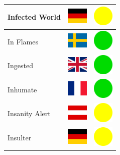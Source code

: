 \documentclass[12pt, a4paper, twoside]{report}
\begin{document}
\begin{center}
\begin{longtable}{|p{5cm}|p{2cm}|p{2cm}|}
Infected World & \includegraphics[width=1cm]{4x3/de} & \includegraphics[width=1cm]{likes/m} \\ \hline
In Flames & \includegraphics[width=1cm]{4x3/se} & \includegraphics[width=1cm]{likes/y} \\ \hline
Ingested & \includegraphics[width=1cm]{4x3/gb} & \includegraphics[width=1cm]{likes/y} \\ \hline
Inhumate & \includegraphics[width=1cm]{4x3/fr} & \includegraphics[width=1cm]{likes/y} \\ \hline
Insanity Alert & \includegraphics[width=1cm]{4x3/at} & \includegraphics[width=1cm]{likes/m} \\ \hline
Insulter & \includegraphics[width=1cm]{4x3/de} & \includegraphics[width=1cm]{likes/m} \\ \hline

\end{longtable}
\end{center}
\end{document}
